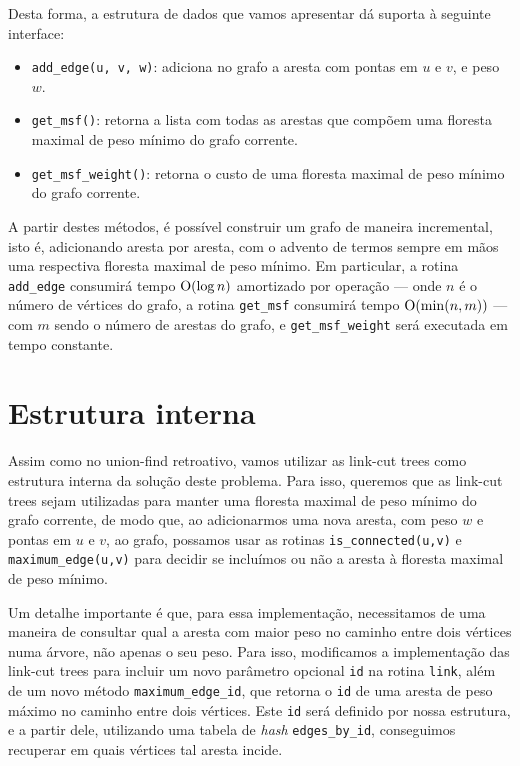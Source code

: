 Desta forma, a estrutura de dados que vamos apresentar dá suporta à seguinte interface:

\begin{itemize}
    \item \texttt{add\_edge(u, v, w)}: adiciona no grafo a aresta com pontas em $u$ e $v$, e peso $w$.
    \item \texttt{get\_msf()}: retorna a lista com todas as arestas que compõem uma floresta maximal de peso mínimo do grafo corrente.
    \item \texttt{get\_msf\_weight()}: retorna o custo de uma floresta maximal de peso mínimo do grafo corrente.
\end{itemize}

A partir destes métodos, é possível construir um grafo de maneira incremental, isto é, adicionando aresta por aresta, com o advento de termos sempre em mãos uma respectiva floresta maximal de peso mínimo. Em particular, a rotina \texttt{add\_edge} consumirá tempo $\mathrm{O} (\log n)$ amortizado por operação --- onde $n$ é o número de vértices do grafo, a rotina \texttt{get\_msf} consumirá tempo $\mathrm{O}(\min(n, m))$ --- com $m$ sendo o número de arestas do grafo, e \texttt{get\_msf\_weight} será executada em tempo constante.

\section{Estrutura interna}
\label{sec:imsf-est-int}

Assim como no union-find retroativo, vamos utilizar as link-cut trees como estrutura interna da solução deste problema. Para isso, queremos que as link-cut trees sejam utilizadas para manter uma floresta maximal de peso mínimo do grafo corrente, de modo que, ao adicionarmos uma nova aresta, com peso $w$ e pontas em $u$ e $v$, ao grafo, possamos usar as rotinas \texttt{is\_connected(u,v)} e \texttt{maximum\_edge(u,v)} para decidir se incluímos ou não a aresta à floresta maximal de peso mínimo.

Um detalhe importante é que, para essa implementação, necessitamos de uma maneira de consultar qual a aresta com maior peso no caminho entre dois vértices numa árvore, não apenas o seu peso. Para isso, modificamos a implementação das link-cut trees para incluir um novo parâmetro opcional \texttt{id} na rotina \texttt{link}, além de um novo  método \texttt{maximum\_edge\_id}, que retorna o \texttt{id} de uma aresta de peso máximo no caminho entre dois vértices. Este \texttt{id} será definido por nossa estrutura, e a partir dele, utilizando uma tabela de \emph{hash} \texttt{edges\_by\_id}, conseguimos recuperar em quais vértices tal aresta incide.

